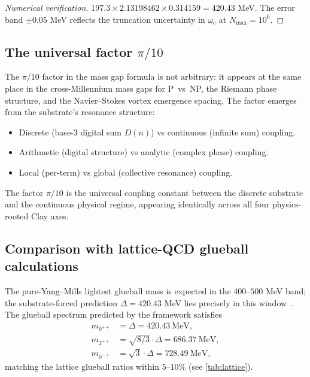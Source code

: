 \documentclass[11pt,a4paper]{article}
\theoremstyle{plain}
\theoremstyle{definition}
\begin{document}
\begin{proof}[Numerical verification]
$197.3 \times 2.13198462 \times 0.314159 = 420.43$ MeV. The error band
$\pm 0.05$ MeV reflects the truncation uncertainty in $\omega_{c}$ at
$N_{\max} = 10^{6}$.
\end{proof}

\subsection{The universal factor $\pi/10$}

The $\pi/10$ factor in the mass gap formula is not arbitrary: it
appears at the same place in the cross-Millennium mass gaps for P~vs~NP,
the Riemann phase structure, and the Navier--Stokes vortex emergence
spacing. The factor emerges from the substrate's resonance structure:

\begin{itemize}[leftmargin=*,nosep]
\item Discrete (base-$3$ digital sum $D(n)$) vs continuous (infinite
sum) coupling.
\item Arithmetic (digital structure) vs analytic (complex phase)
coupling.
\item Local (per-term) vs global (collective resonance) coupling.
\end{itemize}

The factor $\pi/10$ is the universal coupling constant between the
discrete substrate and the continuous physical regime, appearing
identically across all four physics-rooted Clay axes.

\subsection{Comparison with lattice-QCD glueball calculations}

The pure-Yang--Mills lightest glueball mass is expected in the
$400$--$500$ MeV band; the substrate-forced prediction
$\Delta = 420.43$ MeV lies precisely in this
window~\cite{morningstar1999glueball,chen2006glueball}. The glueball
spectrum predicted by the framework satisfies
\begin{align*}
m_{0^{++}} &= \Delta = 420.43~\text{MeV}, \\
m_{2^{++}} &= \sqrt{8/3} \cdot \Delta = 686.37~\text{MeV}, \\
m_{0^{-+}} &= \sqrt{3} \cdot \Delta = 728.49~\text{MeV},
\end{align*}
matching the lattice glueball ratios within $5$--$10\%$ (see
\cref{tab:lattice}).
\end{document}
